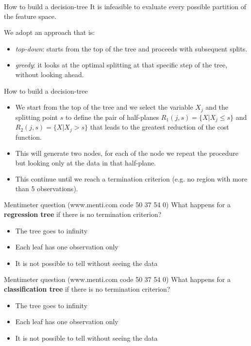 \documentclass[notes]{beamer}          %
\begin{document}
\begin{frame}{How to build a decision-tree}
It is infeasible to evaluate every possible partition of the feature space.

\vspace{0.5cm}
We adopt an approach that is:
\begin{itemize}
	\item \textit{top-down}: starts from the top of the tree and proceeds with subsequent splits.
	\item \textit{greedy}: it looks at the optimal splitting at that specific step of the tree, without looking ahead. 
\end{itemize}
\end{frame}

\begin{frame}{How to build a decision-tree}
\begin{itemize}
	\item We start from the top of the tree and we select the variable $X_j$ and the splitting point $s$ to define the pair of half-planes $R_1(j,s)=\{X|X_j \le s\}$ and $R_2(j,s)=\{X|X_j > s\}$ that leads to the greatest reduction of the cost function.
	\item This will generate two nodes, for each of the node we repeat the procedure but looking only at the data in that half-plane. 
	\item This continue until we reach a termination criterion (e.g. no region with more than 5 observations).
\end{itemize}	

\end{frame}

\begin{frame}{Mentimeter question (www.menti.com code 50 37 54 0)}
What happens for a \textbf{regression tree} if there is no termination criterion?
\begin{itemize}
\item The tree goes to infinity
\item Each leaf has one observation only
\item It is not possible to tell without seeing the data
\end{itemize}	
\end{frame}

\begin{frame}{Mentimeter question (www.menti.com code 50 37 54 0)}
What happens for a \textbf{classification tree} if there is no termination criterion?
\begin{itemize}
\item The tree goes to infinity
\item Each leaf has one observation only
\item It is not possible to tell without seeing the data
\end{itemize}	
\end{frame}
\end{document}
